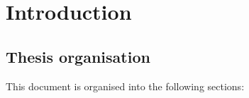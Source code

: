 \chapter{Introduction}


\section{Thesis organisation}

This document is organised into the following sections: